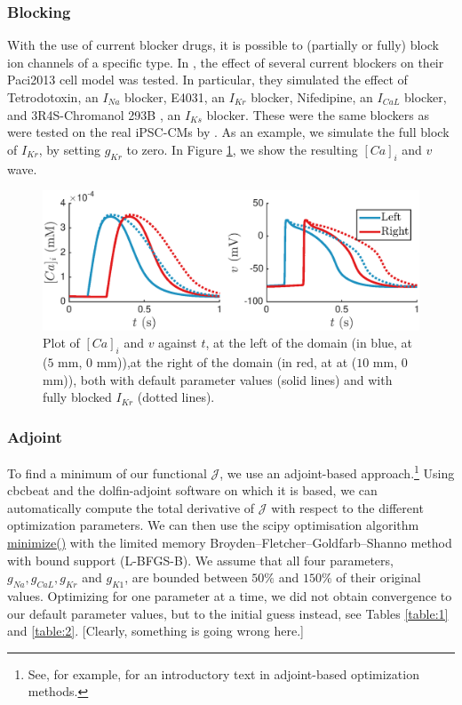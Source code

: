\documentclass{article}
\begin{document}
\subsubsection{Blocking} \label{Blocking}
With the use of current blocker drugs, it is possible to (partially or fully) block ion channels of a specific type. In \cite{Paci2013}, the effect of several current blockers on their Paci2013 cell model was tested. In particular, they simulated the effect of Tetrodotoxin, an $I_{Na}$ blocker, E4031, an $I_{Kr}$ blocker, Nifedipine, an $I_{CaL}$ blocker, and 3R4S-Chromanol 293B , an $I_{Ks}$ blocker. These were the same blockers as were tested on the real iPSC-CMs by \cite{Ma2011}. As an example, we simulate the full block of $I_{Kr}$, by setting $g_{Kr}$ to zero. In Figure \ref{fig:blocking}, we show the resulting $[Ca]_i$ and $v$ wave. 
%
\begin{figure}
   \includegraphics[width=1\linewidth]{blocking} 
    \caption{Plot of $[Ca]_i$ and $v$ against $t$, at the left of the domain (in blue, at ($5$ mm, $0$ mm)),at the right of the domain (in red, at at ($10$ mm, $0$ mm)), both with default parameter values (solid lines) and with fully blocked $I_{Kr}$ (dotted lines).}
    \label{fig:blocking}
\end{figure}
%
\subsubsection{Adjoint} \label{Adjoint}
To find a minimum of our functional $\mathcal{J}$, we use an adjoint-based approach.\footnote{See, for example, \cite{Gunzburger} for an introductory text in adjoint-based optimization methods.} Using cbcbeat and the dolfin-adjoint software on which it is based, we can automatically compute the total derivative of $\mathcal{J}$ with respect to the different optimization parameters. We can then use the scipy optimisation algorithm \url{minimize()} with the limited memory Broyden–Fletcher–Goldfarb–Shanno method with bound support (L-BFGS-B). We assume that all four parameters, $g_{Na}, g_{CaL}, g_{Kr}$ and $g_{K1}$, are bounded between $50\%$ and $150\%$ of their original values.
 Optimizing for one parameter at a time, we did not obtain convergence to our default parameter values, but to the initial guess instead, see Tables \ref{table:1} and \ref{table:2}. [Clearly, something is going wrong here.]
\end{document}
